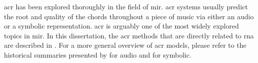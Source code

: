 

\gls{acr} has been explored thoroughly in the field of
\gls{mir}. \gls{acr} systems usually predict the root and
quality of the chords throughout a piece of music via either
an audio or a symbolic representation. \gls{acr} is arguably
one of the most widely explored topics in \gls{mir}. In this
dissertation, the \gls{acr} methods that are directly
related to \gls{rna} are described in
. For a more
general overview of \gls{acr} models, please refer to the
historical summaries presented by \textcite{pauwels201920}
for audio and \textcite[p. 58--88]{ju2021addressing} for
symbolic.
